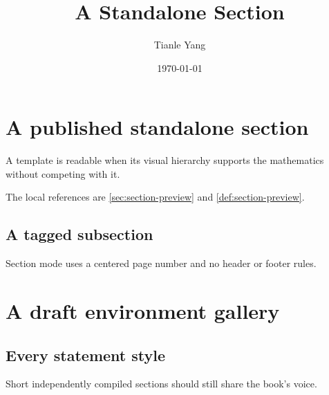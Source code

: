 \documentclass[sectionlevel=section,status=draft]{noteformyself}
\title{A Standalone Section}
\author{Tianle Yang}
\date{\today}
\begin{document}
\maketitle

\section[
  status=published,
  tag=0SE01,
  label=\labelNFM{sec:section-preview}
]{A published standalone section}

\begin{definition}[
  title={Readable typography},
  status=published,
  tag=0SE0101,
  label=\labelNFM{def:section-preview}
]
  A template is readable when its visual hierarchy supports the mathematics
  without competing with it.
\end{definition}

The local references are \cref{sec:section-preview} and
\cref{def:section-preview}.

\subsection[
  status=published,
  tag=0SE0102,
  label=\labelNFM{subsec:section-preview}
]{A tagged subsection}

Section mode uses a centered page number and no header or footer rules.

\section[
  status=draft,
  tag=0SE02,
  label=\labelNFM{sec:section-gallery}
]{A draft environment gallery}

\subsection[
  tag=0SE0201,
  label=\labelNFM{subsec:section-gallery}
]{Every statement style}

\begin{slogan}
  Short independently compiled sections should still share the book's voice.
\end{slogan}
\end{document}
